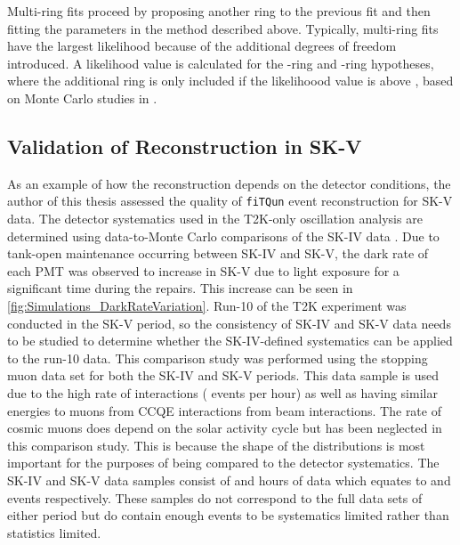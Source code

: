 
Multi-ring fits proceed by proposing another ring to the previous fit and then fitting the parameters in the method described above. Typically, multi-ring fits have the largest likelihood because of the additional degrees of freedom introduced. A likelihood value is calculated for the -ring and -ring hypotheses, where the additional ring is only included if the likelihoood value is above , based on Monte Carlo studies in \cite{Tobayama:2016dsi}.

\subsection{Validation of Reconstruction in SK-V}
\label{sec:Simulation_ReconstructionInSKV}


As an example of how the reconstruction depends on the detector conditions, the author of this thesis assessed the quality of \texttt{fiTQun} event reconstruction for SK-V data. The detector systematics used in the T2K-only oscillation analysis are determined using data-to-Monte Carlo comparisons of the SK-IV data \cite{t2k_tn_399}. Due to tank-open maintenance occurring between SK-IV and SK-V, the dark rate of each PMT was observed to increase in SK-V due to light exposure for a significant time during the repairs. This increase can be seen in \autoref{fig:Simulations_DarkRateVariation}. Run-10 of the T2K experiment was conducted in the SK-V period, so the consistency of SK-IV and SK-V data needs to be studied to determine whether the SK-IV-defined systematics can be applied to the run-10 data. This comparison study was performed using the stopping muon data set for both the SK-IV and SK-V periods. This data sample is used due to the high rate of interactions ( events per hour) as well as having similar energies to muons from CCQE \quickmath{\nu_{\mu}} interactions from beam interactions. The rate of cosmic muons does depend on the solar activity cycle \cite{Maghrabi2021} but has been neglected in this comparison study. This is because the shape of the distributions is most important for the purposes of being compared to the detector systematics. The SK-IV and SK-V data samples consist of  and  hours of data which equates to  and  events respectively. These samples do not correspond to the full data sets of either period but do contain enough events to be systematics limited rather than statistics limited.


